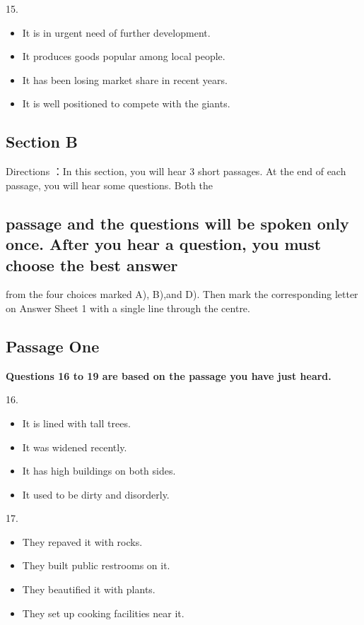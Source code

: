 \documentclass[UTF8,11pt]{ctexart}
\begin{document}
15.


\begin{itemize}[leftmargin=2em,itemsep=.2em,topsep=.4em]\item[A.] It is in urgent need of further development.
\item[B.] It produces goods popular among local people.
\item[C.] It has been losing market share in recent years.
\item[D.] It is well positioned to compete with the giants.
\end{itemize}

\subsection*{\textbf{Section B}}


Directions ：In this section, you will hear 3 short passages. At the end of each passage, you will hear some questions. Both the


\subsection*{passage and the questions will be spoken only once. After you hear a question, you must choose the best answer}


from the four choices marked A), B),and D). Then mark the corresponding letter on Answer Sheet 1 with a single line through the centre.


\subsection*{\textbf{Passage One}}


\textbf{Questions 16 to 19 are based on the passage you have just heard.}


16.


\begin{itemize}[leftmargin=2em,itemsep=.2em,topsep=.4em]\item[A.] It is lined with tall trees.
\item[B.] It was widened recently.
\item[C.] It has high buildings on both sides.
\item[D.] It used to be dirty and disorderly.
\end{itemize}

17.


\begin{itemize}[leftmargin=2em,itemsep=.2em,topsep=.4em]\item[A.] They repaved it with rocks.
\item[B.] They built public restrooms on it.
\item[C.] They beautified it with plants.
\item[D.] They set up cooking facilities near it.
\end{itemize}
\end{document}
